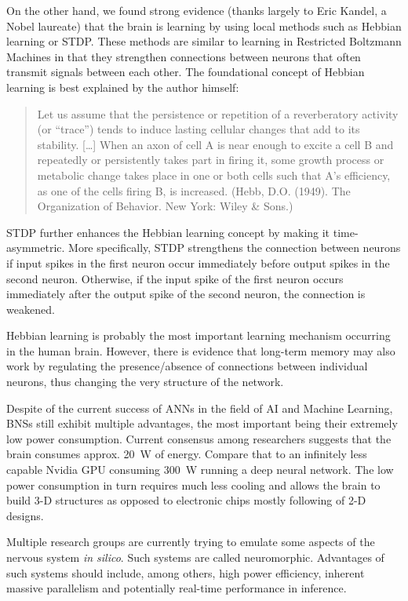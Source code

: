 On the other hand, we found strong evidence (thanks largely to Eric Kandel, a Nobel laureate) that the brain is learning by using local methods such as Hebbian learning or \ac{STDP}. These methods are similar to learning in Restricted Boltzmann Machines in that they strengthen connections between neurons that often transmit signals between each other. The foundational concept of Hebbian learning is best explained by the author himself:

\begin{quote}
    Let us assume that the persistence or repetition of a reverberatory activity (or ``trace'') tends to induce lasting cellular changes that add to its stability. […] When an axon of cell A is near enough to excite a cell B and repeatedly or persistently takes part in firing it, some growth process or metabolic change takes place in one or both cells such that A's efficiency, as one of the cells firing B, is increased. (Hebb, D.O. (1949). The Organization of Behavior. New York: Wiley \& Sons.)
\end{quote}

STDP further enhances the Hebbian learning concept by making it time-asymmetric. More specifically, STDP strengthens the connection between neurons if input spikes in the first neuron occur immediately before output spikes in the second neuron. Otherwise, if the input spike of the first neuron occurs immediately after the output spike of the second neuron, the connection is weakened.

Hebbian learning is probably the most important learning mechanism occurring in the human brain. However, there is evidence that long-term memory may also work by regulating the presence/absence of connections between individual neurons, thus changing the very structure of the network. 

Despite of the current success of ANNs in the field of AI and Machine Learning, BNSs still exhibit multiple advantages, the most important being their extremely low power consumption. Current consensus among researchers suggests that the brain consumes approx. 20~W of energy. Compare that to an infinitely less capable Nvidia GPU consuming 300~W running a deep neural network. The low power consumption in turn requires much less cooling and allows the brain to build 3-D structures as opposed to electronic chips mostly following of 2-D designs.

Multiple research groups are currently trying to emulate some aspects of the nervous system \textit{in silico}. Such systems are called neuromorphic. Advantages of such systems should include, among others, high power efficiency, inherent massive parallelism and potentially real-time performance in inference. 